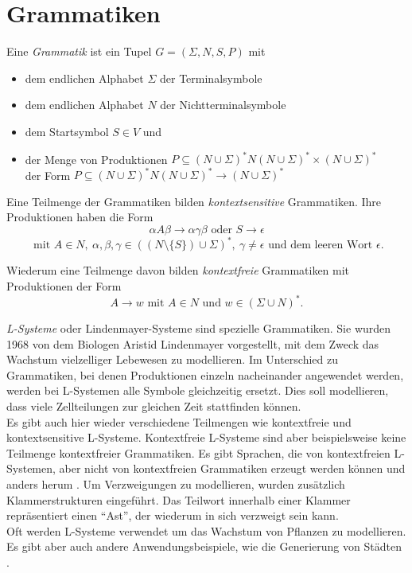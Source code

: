 \section{Grammatiken}
\label{grammars}

Eine \emph{Grammatik} ist ein Tupel $G = (\Sigma, N, S, P)$ mit 
\begin{itemize}
 \item dem endlichen Alphabet $\Sigma$ der Terminalsymbole
 \item dem endlichen Alphabet $N$ der Nichtterminalsymbole
 \item dem Startsymbol $S \in V$ und
 \item der Menge von Produktionen $P \subseteq (N \cup \Sigma)^* N (N \cup \Sigma)^* \times (N \cup \Sigma)^*$\\ der Form $P \subseteq (N \cup \Sigma)^* N (N \cup \Sigma)^* \rightarrow (N \cup \Sigma)^*$
\end{itemize}

Eine Teilmenge der Grammatiken bilden \emph{kontextsensitive} Grammatiken. Ihre Produktionen haben die Form
\[\alpha A \beta \rightarrow \alpha \gamma \beta \text{ oder } S \rightarrow \epsilon\] \[\text{ mit } A \in N,~ \alpha, \beta, \gamma \in ((N \setminus \{ S \}) \cup \Sigma)^*,~ \gamma \neq \epsilon \text{ und dem leeren Wort } \epsilon.\]

Wiederum eine Teilmenge davon bilden \emph{kontextfreie} Grammatiken mit Produktionen der Form 
\[A \rightarrow w \text{ mit } A \in N \text{ und } w \in (\Sigma \cup N)^*.\] \cite[Abschnitte 1.4 und 1.5]{FormalLanguageTheory}

\emph{L-Systeme} oder Lindenmayer-Systeme sind spezielle Grammatiken. Sie wurden 1968 von dem Biologen Aristid Lindenmayer vorgestellt, mit dem Zweck das Wachstum vielzelliger Lebewesen zu modellieren. Im Unterschied zu Grammatiken, bei denen Produktionen einzeln nacheinander angewendet werden, werden bei L-Systemen alle Symbole gleichzeitig ersetzt. Dies soll modellieren, dass viele Zellteilungen zur gleichen Zeit stattfinden können.\\
Es gibt auch hier wieder verschiedene Teilmengen wie \zb kontextfreie und kontextsensitive L-Systeme. Kontextfreie L-Systeme sind aber beispielsweise keine Teilmenge kontextfreier Grammatiken. Es gibt Sprachen, die von kontextfreien L-Systemen, aber nicht von kontextfreien Grammatiken erzeugt werden können und anders herum \cite[Abbildung 1.2]{AlgorithmicBeautyOfPlants}. Um Verzweigungen zu modellieren, wurden zusätzlich Klammerstrukturen eingeführt. Das Teilwort innerhalb einer Klammer repräsentiert einen "`Ast"', der wiederum in sich verzweigt sein kann.\\
Oft werden L-Systeme verwendet um das Wachstum von Pflanzen zu modellieren. Es gibt aber auch andere Anwendungsbeispiele, wie \zb die Generierung von Städten \cite{cityGeneration}. \cite[Kapitel 1]{AlgorithmicBeautyOfPlants}



